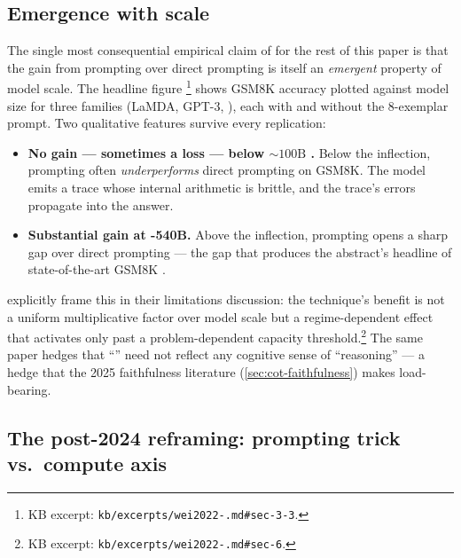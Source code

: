 \subsection{Emergence with scale}
\label{sec:cot-emergence}

The single most consequential empirical claim of
\citet{wei2022-cot} for the rest of this paper is that the gain from
 prompting over direct prompting is itself an
\emph{emergent} property of model scale. The headline figure
\citep[\S 3.3, fig.\ 4]{wei2022-cot}\footnote{KB excerpt:
\texttt{kb/excerpts/wei2022-.md\#sec-3-3}.} shows GSM8K accuracy
plotted against model size for three families (LaMDA, GPT-3, ),
each with and without the 8-exemplar  prompt. Two qualitative
features survive every replication:
\begin{itemize}
\item \textbf{No gain — sometimes a loss — below ${\sim}100\text{B}$
.} Below the inflection,  prompting often
\emph{underperforms} direct prompting on GSM8K. The model emits a
trace whose internal arithmetic is brittle, and the trace's errors
propagate into the answer.
\item \textbf{Substantial gain at -540B.} Above the inflection,
 prompting opens a sharp gap over direct prompting — the gap that
produces the abstract's headline of state-of-the-art GSM8K
\citep[abstract]{wei2022-cot}.
\end{itemize}
\citet[\S 6]{wei2022-cot} explicitly frame this in their limitations
discussion: the technique's benefit is not a uniform multiplicative
factor over model scale but a regime-dependent effect that activates
only past a problem-dependent capacity threshold.\footnote{KB excerpt:
\texttt{kb/excerpts/wei2022-.md\#sec-6}.} The same paper hedges
that ``'' need not reflect any cognitive sense of
``reasoning'' — a hedge that the 2025 faithfulness literature
(\cref{sec:cot-faithfulness}) makes load-bearing.

\subsection{The post-2024 reframing: prompting trick vs.\ compute axis}
\label{sec:cot-reframing}

